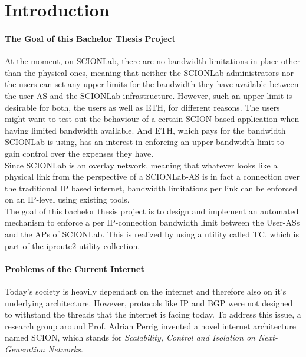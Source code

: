 \chapter{Introduction}

\subsubsection{The Goal of this Bachelor Thesis Project}

At the moment, on \acs{SCIONLab}, there are no bandwidth limitations in place other than the physical ones, meaning that neither the \acs{SCIONLab} administrators nor the users can set any upper limits for the bandwidth they have available between the user-\acs{AS} and the \acs{SCIONLab} infrastructure. However, such an upper limit is desirable for both, the users as well as \acs{ETH}, for different reasons. The users might want to test out the behaviour of a certain \acs{SCION} based application when having limited bandwidth available. And \acs{ETH}, which pays for the bandwidth \acs{SCIONLab} is using, has an interest in enforcing an upper bandwidth limit to gain control over the expenses they have.
\\
Since \acs{SCIONLab} is an overlay network, meaning that whatever looks like a physical link from the perspective of a \acs{SCIONLab}-\acs{AS} is in fact a connection over the traditional \acs{IP} based internet, bandwidth limitations per link can be enforced on an \acs{IP}-level using existing tools.
\\
The goal of this bachelor thesis project is to design and implement an automated mechanism to enforce a per \acs{IP}-connection bandwidth limit between the User-\acsp{AS} and the \aclp{AP} of \acs{SCIONLab}. This is realized by using a utility called \ac{TC}, which is part of the iproute2 utility collection.

\newpage

\subsubsection{Problems of the Current Internet}

Today's society is heavily dependant on the internet and therefore also on it's underlying architecture. However, protocols like \ac{IP} and \ac{BGP} were not designed to withstand the threads that the internet is facing today. To address this issue, a research group around Prof. Adrian Perrig invented a novel internet architecture named \ac{SCION}, which stands for \textit{Scalability, Control and Isolation on Next-Generation Networks}.

